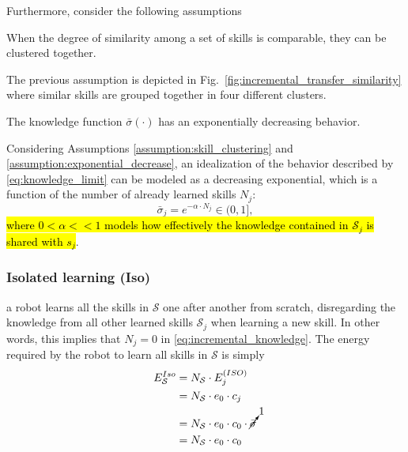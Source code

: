 Furthermore, consider the following assumptions
\begin{tcolorbox}
	\begin{assumption}\label{assumption:skill_clustering} When the degree of similarity among a set of skills is comparable, they can be clustered together.
	\end{assumption}
\end{tcolorbox}
The previous assumption is depicted in Fig.~\ref{fig:incremental_transfer_similarity} where similar skills are grouped together in four different clusters.
\begin{tcolorbox}
	\begin{assumption}\label{assumption:exponential_decrease} The knowledge function $\bar{\sigma}(\cdot)$ has an exponentially decreasing behavior.
	\end{assumption}
\end{tcolorbox} 
Considering Assumptions \ref{assumption:skill_clustering} and \ref{assumption:exponential_decrease}, an idealization of the behavior described by \eqref{eq:knowledge_limit} can be modeled as a decreasing exponential, which is a function of the number of already learned skills $N_j$:%
\begin{equation}\label{eq:incremental_knowledge}
  \bar{\sigma}_j = e^{-\alpha  \cdot N_{j}} \in (0,1],
\end{equation}
\hl{where $ 0<\alpha<<1$ models how effectively the knowledge contained in $\mathcal{S}_j$ is shared with $s_j$}.

\subsubsection{\textbf{Isolated learning (Iso)}} a robot learns all the skills in $\mathcal{S}$ one after another from scratch, disregarding the knowledge from all other learned skills $\mathcal{S}_j$ when learning a new skill. In other words, this implies that $N_j = 0$ in \eqref{eq:incremental_knowledge}. The energy required by the robot to learn all skills in $\mathcal{S}$ is simply
\begin{align}
    \begin{split}
      E^{Iso}_{\mathcal{S}} &= N_{\mathcal{S}} \cdot E^{(ISO)}_j\\ 
      &= N_{\mathcal{S}} \cdot e_{0} \cdot c_{j} \\
      &= N_{\mathcal{S}} \cdot e_{0} \cdot c_{0} \cdot \cancelto{1}{\bar{\sigma}}\\
      &= N_{\mathcal{S}} \cdot e_{0} \cdot c_{0}
    \end{split}
\end{align}

